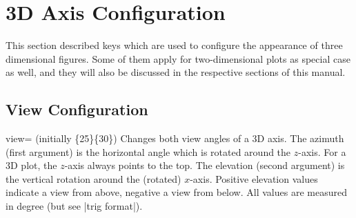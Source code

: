 
\section{3D Axis Configuration}
\label{sec:3d:axis:config}

{

This section described keys which are used to configure the appearance of three
dimensional figures. Some of them apply for two-dimensional plots as special
case as well, and they will also be discussed in the respective sections of
this manual.


\subsection{View Configuration}

\begin{pgfplotskey}{view= (initially \{25\}\{30\})}
%
%
    Changes both view angles of a 3D axis. The azimuth (first argument) is the
    horizontal angle which is rotated around the $z$-axis. For a 3D plot, the
    $z$-axis always points to the top. The elevation (second argument) is the
    vertical rotation around the (rotated) $x$-axis. Positive elevation values
    indicate a view from above, negative a view from below. All values are
    measured in degree (but see |trig format|).
\pgfplotsexpensiveexample
\begin{codeexample}[]
\end{codeexample}

\pgfplotsexpensiveexample
\begin{codeexample}[]
\end{codeexample}

\pgfplotsexpensiveexample
\begin{codeexample}[]
\end{codeexample}


\end{pgfplotskey}}
